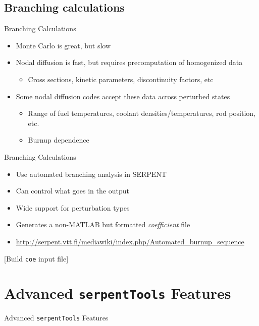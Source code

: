 \documentclass{beamer}
\newcommand{\st}{\texttt{serpentTools} }
\newcommand{\examplefile}[1]{\centerline{[Build \texttt{#1} input file]}}
\begin{document}
\subsection{Branching calculations}

\begin{frame}{Branching Calculations}
    \begin{itemize}
        \item Monte Carlo is great, but slow
        \item Nodal diffusion is fast, but requires precomputation of homogenized data
        \begin{itemize}
            \item Cross sections, kinetic parameters, discontinuity factors, etc
        \end{itemize}
    \item Some nodal diffusion codes accept these data across perturbed states
        \begin{itemize}
            \item Range of fuel temperatures, coolant densities/temperatures, rod position, etc.
            \item Burnup dependence
        \end{itemize}
    \end{itemize}
\end{frame}

\begin{frame}{Branching Calculations}
    \begin{itemize}
        \item Use automated branching analysis in SERPENT
        \item Can control what goes in the output
        \item Wide support for perturbation types
        \item Generates a non-MATLAB but formatted \textit{coefficient} file
        \item \url{http://serpent.vtt.fi/mediawiki/index.php/Automated\_burnup\_sequence}
    \end{itemize}
    \examplefile{coe}
\end{frame}


\section{Advanced \st Features}

\begin{frame}{Advanced \st Features}
    \tableofcontents[sectionstyle=show/hide,subsectionstyle=show/show/hide]
\end{frame}
\end{document}
